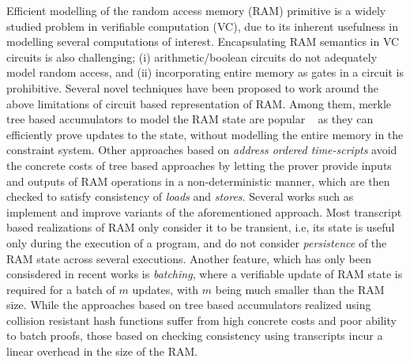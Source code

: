 Efficient modelling of the random access memory (RAM) primitive is a widely studied problem in
verifiable computation (VC), due to its inherent usefulness in modelling several computations of interest.
Encapsulating RAM semantics in VC circuits is also challenging; (i) arithmetic/boolean circuits do not
adequately model random access, and (ii) incorporating entire memory as gates in a circuit is prohibitive.
Several novel techniques have been proposed to work around the above limitations of circuit based representation
of RAM. Among them, merkle tree based accumulators to model the RAM state are popular
~\cite{EPRINT:BFRSBW13,compwithstate,C:BCTV14} as they can efficiently
prove updates to the state, without modelling the entire memory in the constraint system. Other
approaches based on {\em address ordered time-scripts} avoid the concrete costs of tree based approaches
by letting the prover provide inputs and outputs of RAM operations in a non-deterministic manner, which
are then checked to satisfy consistency of {\em loads} and {\em stores}.
Several works such as \cite{NDSS:WSRBW15,USENIX:BCTV14,C:BCGTV13,SP:ZGKPP18} implement and improve variants
of the aforementioned approach. Most transcript based realizations of RAM only consider it to be transient,
i.e, its state is useful only during the execution of a program, and do not consider {\em persistence} of the
RAM state across several executions. Another feature, which has only been consisdered in recent works
\cite{USENIX:OWWB20, EPRINT:CFHKKO21} is {\em batching}, where a verifiable update of RAM state is required
for a batch of $m$ updates, with $m$ being much smaller than the RAM size. While the approaches based on tree
based accumulators realized using collision resistant hash functions suffer from high concrete costs and poor
ability to batch proofs, those based on checking consistency using transcripts incur a linear overhead in the
size of the RAM.

